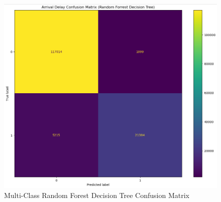 \documentclass[a4paper,12pt]{article}
\begin{document}
\begin{figure}[!]
    \centering
    \includegraphics*[scale=.50]{../../img/model_rq1_cfmtrx_3.png}
    \caption[]{Multi-Class Random Forest Decision Tree Confusion Matrix}
    \label{fig:model:rq1:cfmtrx_3}
\end{figure}
\end{document}
